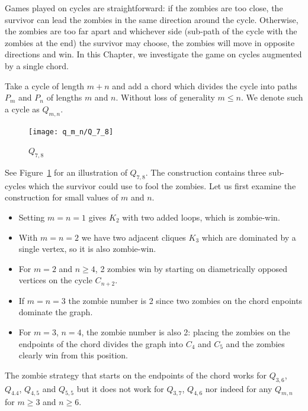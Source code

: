 Games played on cycles are straightforward: if the zombies are too close, the survivor can lead
the zombies in the same direction around the cycle. Otherwise, the zombies are too far apart and whichever side (sub-path of the cycle with the zombies at the end) the survivor may choose, the zombies will move in opposite directions and win. In this Chapter, we investigate the game on cycles augmented by a single chord.

\begin{definition}
 Take a cycle of length $m+n$ and add a chord which
 divides the cycle into paths $P_m$ and $P_n$ of lengths $m$ and $n$.
 Without loss of generality $m \leq n$. We denote such a cycle as $Q_{m,n}$.
\end{definition}

\begin{figure}
  \centering
 \texttt{[image: q\_m\_n/Q\_7\_8]}
 \caption{$Q_{7,8}$ \label{fig:Q_7_8}}
\end{figure}

See Figure~\ref{fig:Q_7_8} for an illustration of $Q_{7,8}$.
The construction contains three sub-cycles which the survivor could use to fool the zombies.
Let us first examine the construction for small values of $m$ and $n$.

 \begin{itemize}
  \item Setting $m=n=1$ gives $K_2$ with two added loops, which is zombie-win.

  \item With $m=n=2$ we have two adjacent cliques $K_3$ which are dominated by a single vertex,
  so it is also zombie-win.

  \item For $m=2$ and $n\geq 4$, 2 zombies win by starting on diametrically
  opposed vertices on the cycle $C_{n+2}$.

  \item If $m=n=3$ the zombie number is 2 since two zombies on the chord enpoints dominate the graph.

  \item For $m=3$, $n=4$, the zombie number is also 2: placing the zombies on the endpoints
  of the chord divides the graph into $C_4$ and $C_5$ and the zombies clearly win from this
  position.

\end{itemize}

The zombie strategy that starts on the endpoints of the chord works for $Q_{3,6}$, $Q_{4.4}$, $Q_{4,5}$ and $Q_{5,5}$ but it does
not work for $Q_{3,7}$, $Q_{4,6}$ nor indeed for any $Q_{m,n}$ for $m \geq 3$ and $n \geq 6$.


